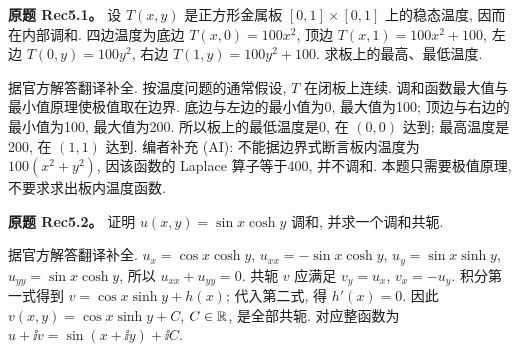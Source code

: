\begin{exercise}
\textbf{原题 Rec5.1。}\label{ass:rec5-1}
设 $T(x,y)$ 是正方形金属板 $[0,1]\times[0,1]$ 上的稳态温度, 因而在内部调和. 四边温度为底边 $T(x,0)=100x^2$, 顶边 $T(x,1)=100x^2+100$, 左边 $T(0,y)=100y^2$, 右边 $T(1,y)=100y^2+100$. 求板上的最高、最低温度.
\end{exercise}
\begin{solution}
据官方解答翻译补全. 按温度问题的通常假设, $T$ 在闭板上连续. 调和函数最大值与最小值原理使极值取在边界. 底边与左边的最小值为0, 最大值为100; 顶边与右边的最小值为100, 最大值为200. 所以板上的最低温度是0, 在 $(0,0)$ 达到; 最高温度是200, 在 $(1,1)$ 达到. 编者补充 (AI): 不能据边界式断言板内温度为 $100(x^2+y^2)$, 因该函数的 Laplace 算子等于400, 并不调和. 本题只需要极值原理, 不要求求出板内温度函数.
\end{solution}
\begin{exercise}
\textbf{原题 Rec5.2。}\label{ass:rec5-2}
证明 $u(x,y)=\sin x\cosh y$ 调和, 并求一个调和共轭.
\end{exercise}
\begin{solution}
据官方解答翻译补全. $u_x=\cos x\cosh y$, $u_{xx}=-\sin x\cosh y$, $u_y=\sin x\sinh y$, $u_{yy}=\sin x\cosh y$, 所以 $u_{xx}+u_{yy}=0$. 共轭 $v$ 应满足 $v_y=u_x$, $v_x=-u_y$. 积分第一式得到 $v=\cos x\sinh y+h(x)$; 代入第二式, 得 $h'(x)=0$. 因此 $v(x,y)=\cos x\sinh y+C$, $C\in\mathbb R$, 是全部共轭. 对应整函数为 $u+\ii v=\sin(x+\ii y)+\ii C$.
\end{solution}
